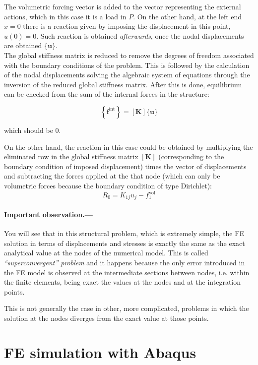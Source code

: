 \documentclass[spanish,a4paper,12pt]{article}
\begin{document}
\clearpage
 
The volumetric forcing vector is added to the vector representing the external actions, which in this case it is a load in $P$. On the other hand, at the left end $x=0$ there is a reaction given by imposing the displacement in this point, $u(0)=0$. Such reaction is obtained \textit{afterwards}, once the nodal displacements are obtained $\{\mathbf{u}\}$. \\
 
 The global stiffness matrix is reduced to remove the degrees of freedom associated with the boundary conditions of the problem. This is followed by the calculation of the nodal displacements solving the algebraic system of equations through the inversion of the reduced global stiffness matrix. After this is done, equilibrium can be checked from the sum of the internal forces in the structure:

$$
\left\{\mathbf{f}^{\text {int}}\right\}=[\mathbf{K}]\{\mathbf{u}\}
$$

which should be 0.
 
 On the other hand, the reaction in this case could be obtained by multiplying the eliminated row in the global stiffness matrix $[\mathbf{K}]$ (corresponding to the boundary condition of imposed displacement) times the vector of displacements and subtracting the forces applied at the that node (which can only be volumetric forces because the boundary condition of type Dirichlet):
 $$
 R_0=K_{1j}u_j-f^{\text {vol}}_1
$$

\paragraph{Important observation.---}
You will see that in this structural problem, which is extremely simple, the FE solution in terms of displacements and stresses is exactly the same as the exact analytical value at the nodes of the numerical model. This is called \emph{``superconvergent'' problem} and it happens because the only error introduced in the FE model is observed at the intermediate sections between nodes, i.e. within the finite elements, being exact the values at the nodes and at the integration points.

This is not generally the case in other, more complicated, problems in which the solution at the nodes diverges from the exact value at those points.



\clearpage

\section{FE simulation with Abaqus}
\label{sec:abaqus}
\end{document}
